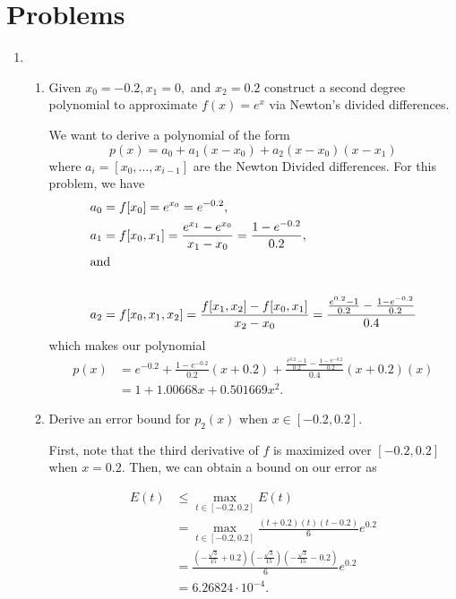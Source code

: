 \documentclass[a4paper,12pt]{article}
\begin{document}
\section*{Problems}
\begin{enumerate}[label = \arabic*.]
	\item \
		\begin{enumerate}[label = (\roman*)]
			\item Given $ x_0 = -0.2, x_1 = 0, $ and $ x_2 = 0.2 $ construct a second degree polynomial to approximate $ f(x) = e^x $ via Newton's divided differences.
			
			We want to derive a polynomial of the form
			\[
				p(x) = a_0 + a_1 (x - x_0) + a_2 (x - x_0)(x - x_1)
			\]
			where $ a_i = [x_0, \ldots, x_{i-1}] $ are the Newton Divided differences. For this problem, we have
			\begin{align*}
				a_0 &= f[x_0] = e^{x_0} = e^{-0.2}, \\
				a_1 &= f[x_0, x_1] = \frac{e^{x_1} - e^{x_0}}{x_1 - x_0} = \frac{1 - e^{-0.2}}{0.2},\\
				\shortintertext{and} \\
				a_2 &= f[x_0, x_1, x_2] = \frac{f[x_1, x_2] - f[x_0, x_1]}{x_2 - x_0} = \frac{\frac{e^{0.2} - 1}{0.2} - \frac{1 - e^{-0.2}}{0.2}}{0.4}
			\end{align*}
			which makes our polynomial
			\begin{align*}
				p(x) &= e^{-0.2} + \frac{1 - e^{-0.2}}{0.2}(x + 0.2) + \frac{\frac{e^{0.2} - 1}{0.2} - \frac{1 - e^{-0.2}}{0.2}}{0.4} (x + 0.2)(x) \\
				&= 1 + 1.00668 x + 0.501669 x^2.
			\end{align*}
			
			\item Derive an error bound for $ p_2(x) $ when $ x \in [-0.2, 0.2] $.
			
			First, note that the third derivative of $ f $ is maximized over $ [-0.2,0.2] $ when $ x = 0.2 $. Then, we can obtain a bound on our error as
			
			\begin{align*}
				E(t) &\leq \max_{t \in [-0.2, 0.2]} E(t) \\
				&= \max_{t \in [-0.2, 0.2]} \frac{(t + 0.2)(t)(t - 0.2)}{6} e^{0.2} \\
				&= \frac{(-\frac{\sqrt{3}}{15} + 0.2)(-\frac{\sqrt{3}}{15})(-\frac{\sqrt{3}}{15} - 0.2)}{6} e^{0.2} \\
				&= 6.26824 \cdot 10^{-4}.
			\end{align*}
			

\end{enumerate}
\end{enumerate}
\end{document}
